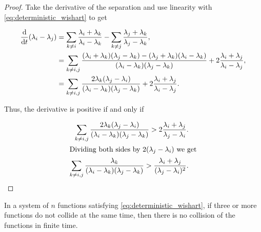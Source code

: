\begin{proof}

    Take the derivative of the separation and use linearity with \eqref{eq:deterministic_wishart} to get

    \begin{align*}
        \frac{\mathrm d}{\mathrm d t}(\lambda_i - \lambda_j) &= \sum_{k\neq i} \frac{\lambda_i + \lambda_k}{\lambda_i - \lambda_k} - \sum_{k\neq j} \frac{\lambda_j + \lambda_k}{\lambda_j - \lambda_k}, \\
        &= \sum_{k \neq i,j} \frac{ (\lambda_i + \lambda_k)(\lambda_j - \lambda_k) - (\lambda_j + \lambda_k)(\lambda_i - \lambda_k) }{(\lambda_i - \lambda_k)(\lambda_j - \lambda_k)} + 2\frac{\lambda_i + \lambda_j}{\lambda_i - \lambda_j},\\
        &= \sum_{k\neq i,j} \frac{2\lambda_k(\lambda_j - \lambda_i)}{(\lambda_i-\lambda_k)(\lambda_j-\lambda_k)} + 2 \frac{\lambda_i + \lambda_j}{\lambda_i - \lambda_j}.
    \end{align*}

    Thus, the derivative is positive if and only if 

    \begin{align*}
        \sum_{k\neq i,j} \frac{2\lambda_k(\lambda_j - \lambda_i)}{(\lambda_i-\lambda_k)(\lambda_j-\lambda_k)} > 2 \frac{\lambda_i + \lambda_j}{\lambda_j - \lambda_i}.\\
        \intertext{Dividing both sides by $2(\lambda_j - \lambda_i)$ we get}
        \sum_{k\neq i,j} \frac{\lambda_k}{(\lambda_i-\lambda_k)(\lambda_j-\lambda_k)} >  \frac{\lambda_i + \lambda_j}{(\lambda_j - \lambda_i)^2}.
    \end{align*}
\end{proof}

\begin{corollary}
    In a system of $n$ functions satisfying \eqref{eq:deterministic_wishart}, if three or more functions do not collide at the same time, then there is no collision of the functions in finite time.
\end{corollary}

